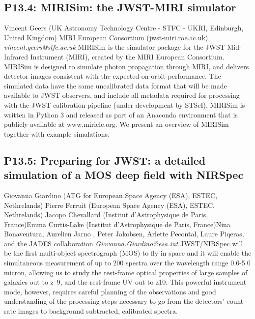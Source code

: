 \documentclass{report}
\begin{document}
\subsection*{P13.4: MIRISim: the JWST-MIRI simulator}
\bigskip
Vincent Geers (UK Astronomy Technology Centre - STFC - UKRI, Edinburgh, United Kingdom) \newline MIRI European Consortium (jwst-miri.roe.ac.uk) \newline   \newline   \newline  \newline  \newline\newline
{\it vincent.geers@stfc.ac.uk}\newline
\newline\newline
MIRISim is the simulator package for the JWST Mid-Infrared Instrument (MIRI), created by the MIRI European Consortium. MIRISim is designed to simulate photon propagation through MIRI, and delivers detector images consistent with the expected on-orbit performance. The simulated data have the same uncalibrated data format that will be made available to JWST observers, and include all metadata required for processing with the JWST calibration pipeline (under development by STScI). MIRISim is written in Python 3 and released as part of an Anaconda environment that is publicly available at www.miricle.org. We present an overview of MIRISim together with example simulations.\newline
\newpage
\subsection*{P13.5: Preparing for JWST: a detailed simulation of a MOS deep field with NIRSpec}
\bigskip
Giovanna Giardino (ATG for European Space Agency (ESA), ESTEC, Nethrelands) \newline Pierre Ferruit (European Space Agency (ESA), ESTEC, Nethrelands) \newline  Jacopo Chevallard (Institut d’Astrophysique de Paris, France)\newline  Emma Curtis-Lake (Institut d’Astrophysique de Paris, France)\newline  \newline  Nina Bonaventura, Aurelien Jarno , Peter Jakobsen, Arlette Pecontal, Laure Piqeras, and the JADES collaboration\newline\newline
{\it Giovanna.Giardino@esa.int}\newline
\newline\newline
JWST/NIRSpec will be the first multi-object spectrograph (MOS) to fly
in space and it will enable the simultaneous measurement of up to 200
spectra over the wavelength range 0.6-5.0 micron, allowing us to study
the rest-frame optical properties of large samples of galaxies out to
z~9, and the rest-frame UV out to z10. This powerful
instrument mode, however, requires careful planning of the
observations and good understanding of the processing steps necessary
to go from the detectors' count-rate images to background subtracted,
calibrated spectra.
\end{document}
